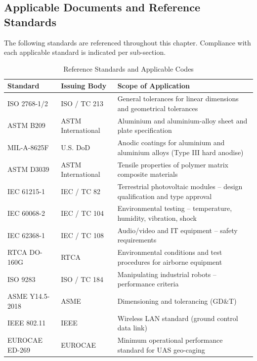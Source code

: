 \subsection{Applicable Documents and Reference Standards}

The following standards are referenced throughout this chapter. Compliance with each applicable standard is indicated per sub-section.

\begin{table}[H]
\centering
\small
\caption{Reference Standards and Applicable Codes}
\begin{tabularx}{\textwidth}{L{2.2cm} L{4cm} X}
\toprule
\textbf{Standard} &
\textbf{Issuing Body} &
\textbf{Scope of Application} \\
\midrule
ISO 2768-1/2    & ISO / TC 213      & General tolerances for linear dimensions and geometrical tolerances \\
ASTM B209       & ASTM International & Aluminium and aluminium-alloy sheet and plate specification \\
MIL-A-8625F     & U.S. DoD          & Anodic coatings for aluminium and aluminium alloys (Type III hard anodise) \\
ASTM D3039      & ASTM International & Tensile properties of polymer matrix composite materials \\
IEC 61215-1     & IEC / TC 82       & Terrestrial photovoltaic modules -- design qualification and type approval \\
IEC 60068-2     & IEC / TC 104      & Environmental testing -- temperature, humidity, vibration, shock \\
IEC 62368-1     & IEC / TC 108      & Audio/video and IT equipment -- safety requirements \\
RTCA DO-160G    & RTCA              & Environmental conditions and test procedures for airborne equipment \\
ISO 9283        & ISO / TC 184      & Manipulating industrial robots -- performance criteria \\
ASME Y14.5-2018 & ASME             & Dimensioning and tolerancing (GD\&T) \\
IEEE 802.11     & IEEE              & Wireless LAN standard (ground control data link) \\
EUROCAE ED-269  & EUROCAE           & Minimum operational performance standard for UAS geo-caging \\
\bottomrule
\end{tabularx}
\end{table}

